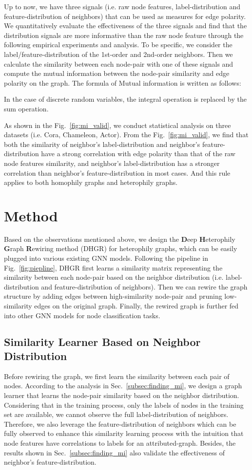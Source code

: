 \documentclass[sigconf]{acmart}
\begin{document}
	Up to now, we have three signals (i.e. raw node features, label-distribution and feature-distribution of neighbors) that can be used as measures for edge polarity. We quantitatively evaluate the effectiveness of the three signals and find that the distribution signals are more informative than the raw node feature through the following empirical experiments and analysis. To be specific, we consider the label/feature-distribution of the 1st-order and 2nd-order neighbors. Then we calculate the similarity between each node-pair with one of these signals and compute the mutual information between the node-pair similarity and edge polarity on the graph.
	The formula of Mutual information is written as follows:
	
	In the case of discrete random variables, the integral operation is replaced by the sum operation. 
	
	As shown in the Fig.~\ref{fig:mi_valid}, we conduct statistical analysis on three datasets (i.e. Cora, Chameleon, Actor). From the Fig.~\ref{fig:mi_valid}, we find that both the similarity of neighbor's label-distribution and neighbor's feature-distribution have a strong correlation with edge polarity than that of the raw node features similarity, and neighbor's label-distribution has a stronger correlation than neighbor's feature-distribution in most cases. And this rule applies to both homophily graphs and heterophily graphs. 	\section{Method}
	Based on the observations mentioned above, we design the \textbf{D}eep \textbf{H}eterophily \textbf{G}raph \textbf{R}ewiring method (DHGR) for heterophily graphs, which can be easily plugged into various existing GNN models. Following the pipeline in Fig.~\ref{fig:piepline}, DHGR first learns a similarity matrix representing the similarity between each node-pair based on the neighbor distribution (i.e. label-distribution and feature-distribution of neighbors). Then we can rewire the graph structure by adding edges between high-similarity node-pair and pruning low-similarity edges on the original graph. Finally, the rewired graph is further fed into other GNN models for node classification tasks.
	
	
	\subsection{Similarity Learner Based on Neighbor Distribution}
	Before rewiring the graph, we first learn the similarity between each pair of nodes. According to the analysis in Sec.~\ref{subsec:finding_mi}, we design a graph learner that learns the node-pair similarity based on the neighbor distribution. Considering that in the training process, only the labels of nodes in the training set are available, we cannot observe the full label-distribution of neighbors. Therefore, we also leverage the feature-distribution of neighbors which can be fully observed to enhance this similarity learning process with the intuition that node features have correlations to labels for an attributed-graph. Besides, the results shown in Sec.~\ref{subsec:finding_mi} also validate the effectiveness of neighbor's feature-distribution.
	
\end{document}
